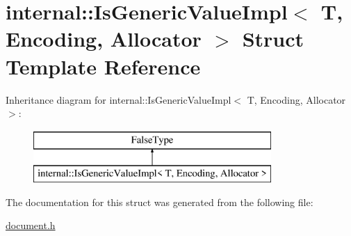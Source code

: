 \hypertarget{a02012}{}\section{internal\+:\+:Is\+Generic\+Value\+Impl$<$ T, Encoding, Allocator $>$ Struct Template Reference}
\label{a02012}
Inheritance diagram for internal\+:\+:Is\+Generic\+Value\+Impl$<$ T, Encoding, Allocator $>$\+:\begin{figure}[H]
\begin{center}
\leavevmode
\includegraphics[height=2.000000cm]{a02012}
\end{center}
\end{figure}


The documentation for this struct was generated from the following file\+:\begin{DoxyCompactItemize}
\item 
\hyperlink{a00476}{document.\+h}\end{DoxyCompactItemize}

